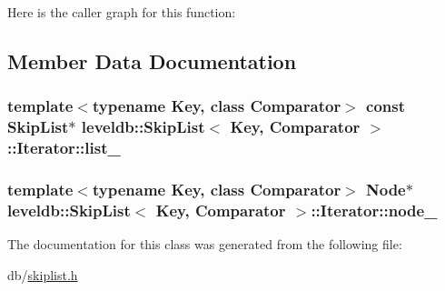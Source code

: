 Here is the caller graph for this function\-:




\subsection{Member Data Documentation}
\hypertarget{classleveldb_1_1_skip_list_1_1_iterator_a975880d27195f53ff0d0e599543b4aba}{
\subsubsection[{list\-\_\-}]{\setlength{\rightskip}{0pt plus 5cm}template$<$typename Key, class Comparator$>$ const {\bf Skip\-List}$\ast$ {\bf leveldb\-::\-Skip\-List}$<$ {\bf Key}, {\bf Comparator} $>$\-::Iterator\-::list\-\_\-\hspace{0.3cm}{\ttfamily [private]}}}\label{classleveldb_1_1_skip_list_1_1_iterator_a975880d27195f53ff0d0e599543b4aba}
\hypertarget{classleveldb_1_1_skip_list_1_1_iterator_aca4dad33d2cb4c9ea3a16f2d5f164a42}{
\subsubsection[{node\-\_\-}]{\setlength{\rightskip}{0pt plus 5cm}template$<$typename Key, class Comparator$>$ {\bf Node}$\ast$ {\bf leveldb\-::\-Skip\-List}$<$ {\bf Key}, {\bf Comparator} $>$\-::Iterator\-::node\-\_\-\hspace{0.3cm}{\ttfamily [private]}}}\label{classleveldb_1_1_skip_list_1_1_iterator_aca4dad33d2cb4c9ea3a16f2d5f164a42}


The documentation for this class was generated from the following file\-:\begin{DoxyCompactItemize}
\item 
db/\hyperlink{skiplist_8h}{skiplist.\-h}\end{DoxyCompactItemize}
